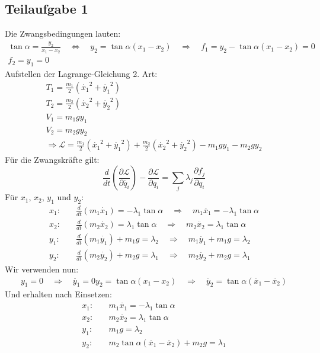 \documentclass[a4paper,german,12pt,smallheadings]{scrartcl}
\begin{document}
\subsection*{Teilaufgabe 1}
Die Zwangsbedingungen lauten:
\begin{align*}
\tan\alpha=\frac{y_2}{x_1-x_2} \quad \Leftrightarrow \quad y_2=\tan\alpha \left(x_1-x_2\right) \quad \Rightarrow \quad f_1=y_2-\tan\alpha \left(x_1-x_2\right)=0\\
f_2=y_1=0
\end{align*}
Aufstellen der Lagrange-Gleichung 2. Art:
\begin{align*}
T_1=\frac{m_1}{2} \left(\dot{x_1}^2+\dot{y_1}^2\right)\\
T_2=\frac{m_2}{2} \left(\dot{x_2}^2+\dot{y_2}^2\right)\\
V_1=m_1gy_1\\
V_2=m_2gy_2\\
\Rightarrow \mathcal{L}=\frac{m_1}{2} \left(\dot{x_1}^2+\dot{y_1}^2\right)+\frac{m_2}{2} \left(\dot{x_2}^2+\dot{y_2}^2\right)-m_1gy_1-m_2gy_2
\end{align*}
Für die Zwangskräfte gilt:
\begin{equation}
\frac{d}{dt}\left(\frac{\partial \mathcal{L}}{\partial \dot{q_i}}\right)-\frac{\partial \mathcal{L}}{\partial q_i}=\sum\limits_j \lambda_j \frac{\partial f_j}{\partial q_i}
\end{equation}
Für $x_1$, $x_2$, $y_1$ und $y_2$:
\begin{align}
x_1: & \quad \frac{d}{dt} \left(m_1 \dot{x_1}\right)=-\lambda_1 \tan \alpha \quad \Rightarrow \quad m_1 \ddot{x_1}=-\lambda_1 \tan \alpha\\
x_2: & \quad  \frac{d}{dt} \left(m_2 \dot{x_2}\right)=\lambda_1 \tan \alpha \quad \Rightarrow \quad m_2 \ddot{x_2}=\lambda_1 \tan \alpha\\
y_1: & \quad \frac{d}{dt} \left(m_1 \dot{y_1}\right)+m_1g=\lambda_2 \quad \Rightarrow \quad m_1 \ddot{y_1}+m_1g=\lambda_2\\
y_2: & \quad \frac{d}{dt} \left(m_2 \dot{y_2}\right)+m_2g=\lambda_1 \quad \Rightarrow \quad m_2 \ddot{y_2}+m_2g=\lambda_1
\end{align}
Wir verwenden nun:
\begin{align*}
y_1=0 \quad \Rightarrow \quad \ddot{y_1}=0
y_2=\tan \alpha \left(x_1-x_2\right) \quad \Rightarrow \quad \ddot{y_2}=\tan \alpha \left(\ddot{x_1}-\ddot{x_2}\right)
\end{align*}
Und erhalten nach Einsetzen:
\begin{align*}
x_1: & \quad m_1 \ddot{x_1}=-\lambda_1 \tan \alpha\\
x_2: & \quad m_2 \ddot{x_2}=\lambda_1 \tan \alpha\\
y_1: & \quad m_1g=\lambda_2\\
y_2: & \quad m_2 \tan \alpha \left(\ddot{x_1}-\ddot{x_2}\right)+m_2g=\lambda_1
\end{align*}
\end{document}
